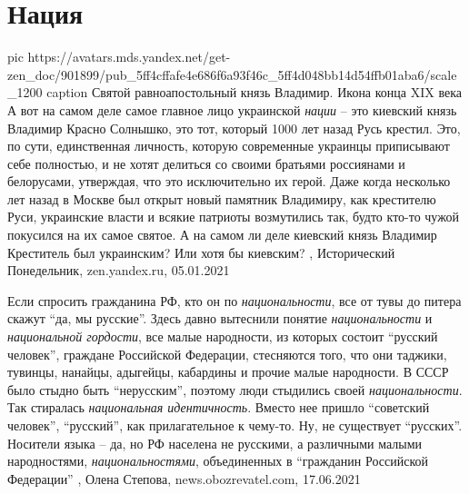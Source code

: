  
 
 
 
 
\chapter{Нация}
\label{sec:slova.nacia}

\ifcmt
  pic https://avatars.mds.yandex.net/get-zen_doc/901899/pub_5ff4cffafe4e686f6a93f46c_5ff4d048bb14d54ffb01aba6/scale_1200
	caption Святой равноапостольный князь Владимир. Икона конца XIX века
\fi
А вот на самом деле самое главное лицо украинской \emph{нации} – это киевский
князь Владимир Красно Солнышко, это тот, который 1000 лет назад Русь крестил.
Это, по сути, единственная личность, которую современные украинцы приписывают
себе полностью, и не хотят делиться со своими братьями россиянами и белорусами,
утверждая, что это исключительно их герой.  Даже когда несколько лет назад в
Москве был открыт новый памятник Владимиру, как крестителю Руси, украинские
власти и всякие патриоты возмутились так, будто кто-то чужой покусился на их
самое святое. А на самом ли деле киевский князь Владимир Креститель был
украинским? Или хотя бы киевским?
,
Исторический Понедельник, zen.yandex.ru, 05.01.2021 

Если спросить гражданина РФ, кто он по \emph{национальности}, все от тувы до питера
скажут \enquote{да, мы русские}. Здесь давно вытеснили понятие \emph{национальности} и
\emph{национальной гордости}, все малые народности, из которых состоит \enquote{русский
человек}, граждане Российской Федерации, стесняются того, что они таджики,
тувинцы, нанайцы, адыгейцы, кабардины и прочие малые народности. В СССР было
стыдно быть \enquote{нерусским}, поэтому люди стыдились своей \emph{национальности}. Так
стиралась \emph{национальная идентичность}. Вместо нее пришло \enquote{советский человек},
\enquote{русский}, как прилагательное к чему-то.  Ну, не существует \enquote{русских}. Носители
языка – да, но РФ населена не русскими, а различными малыми народностями,
\emph{национальностями}, объединенных в \enquote{гражданин Российской Федерации}
, 
Олена Степова, news.obozrevatel.com, 17.06.2021

